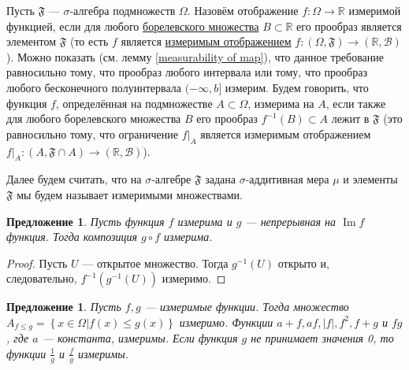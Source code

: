 \documentclass[12pt]{article}
\newtheorem{proposition}[theorem]{Предложение}
\numberwithin{theorem}{section}
\theoremstyle{definition}
\newcommand{\defin}[2]{\hypertarget{#2}{{\color{red} #1}}}
\newcommand{\RR}{\mathbb{R}}
\newcommand{\calB}{\mathcal{B}}
\newcommand{\events}{\mathfrak{F}}
\newcommand{\Image}{\operatorname{Im}}
\newcommand{\defineset}[2]{\left\{
	\left.
	#1
	\right\vert
	#2
	\right\}}
\begin{document}
	Пусть $ \events $ --- $ \sigma $-алгебра подмножеств $ \Omega $.
	Назовём отображение $ f \colon \Omega \to \RR $ \defin{измеримой функцией}{measurable-function},
	если для любого \hyperlink{borel-sets}{борелевского множества} $ B \subset \RR $
	его прообраз является элементом $ \events $ (то есть $ f $ является \hyperlink{morphism-of-measurable-spaces}{измеримым отображением} 
	$ f \colon (\Omega, \events) \to (\RR, \calB) $).
	Можно показать (см. лемму \ref{measurability of map}), что данное требование равносильно тому, что прообраз любого интервала
	или тому, что прообраз любого бесконечного полуинтервала $ (-\infty, b] $ измерим.
	Будем говорить, что функция $ f $, определённая на подмножестве $ A \subset \Omega $,
	\defin{измерима на $ A $}{locally-measurable}, если также для любого борелевского множества $ B $ его прообраз $ f^{-1}(B) \subset A $ лежит в $ \events $ 
	(это равносильно тому, что ограничение $ \left.f\right|_{A} $ является измеримым отображением
	$ \left.f\right|_{A} \colon (A, \events \cap A) \to (\RR, \calB) $).
	
	Далее будем считать, что на $ \sigma $-алгебре $ \events $ задана $ \sigma $-аддитивная мера $ \mu $
	и элементы $ \events $ мы будем называет измеримыми множествами.
	
	\begin{proposition} \label{composition with continuous}
		Пусть функция $ f $ измерима и $ g $ --- непрерывная на $ \Image f $ функция.
		Тогда композиция $ g \circ f $ измерима.
	\end{proposition}
	
	\begin{proof}
		Пусть $ U $ --- открытое множество.
		Тогда $ g^{-1}(U) $ открыто и, следовательно, $ f^{-1}(g^{-1}(U)) $ измеримо.
	\end{proof}
	
	\begin{proposition} \label{measurable functions are good}
		Пусть $ f, g $ --- измеримые функции.
		Тогда множество $ A_{f \leqslant g} = \defineset{x \in \Omega}{f(x) \leqslant g(x)} $
		измеримо.
		Функции $ a + f, af, |f|, f^2, f + g $ и $ fg $, где $ a $ --- константа, измеримы.
		Если функция $ g $ не принимает значения 0, то функции $ \tfrac{1}{g} $ и $ \tfrac{f}{g} $
		измеримы.
	\end{proposition}
	
\end{document}
